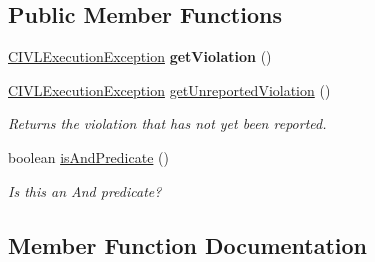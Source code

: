 \subsection*{Public Member Functions}
\begin{DoxyCompactItemize}
\item 
\hypertarget{interfaceedu_1_1udel_1_1cis_1_1vsl_1_1civl_1_1predicate_1_1IF_1_1CIVLStatePredicate_a56a142dd4cec66fef23a4272c1ce30d8}{}\hyperlink{classedu_1_1udel_1_1cis_1_1vsl_1_1civl_1_1log_1_1IF_1_1CIVLExecutionException}{C\+I\+V\+L\+Execution\+Exception} {\bfseries get\+Violation} ()\label{interfaceedu_1_1udel_1_1cis_1_1vsl_1_1civl_1_1predicate_1_1IF_1_1CIVLStatePredicate_a56a142dd4cec66fef23a4272c1ce30d8}

\item 
\hyperlink{classedu_1_1udel_1_1cis_1_1vsl_1_1civl_1_1log_1_1IF_1_1CIVLExecutionException}{C\+I\+V\+L\+Execution\+Exception} \hyperlink{interfaceedu_1_1udel_1_1cis_1_1vsl_1_1civl_1_1predicate_1_1IF_1_1CIVLStatePredicate_ad126976823c876047d5d12322f231fd2}{get\+Unreported\+Violation} ()
\begin{DoxyCompactList}\small\item\em Returns the violation that has not yet been reported. \end{DoxyCompactList}\item 
boolean \hyperlink{interfaceedu_1_1udel_1_1cis_1_1vsl_1_1civl_1_1predicate_1_1IF_1_1CIVLStatePredicate_ad2d1ebc37f839517ac8486ea1ba37701}{is\+And\+Predicate} ()
\begin{DoxyCompactList}\small\item\em Is this an And predicate? \end{DoxyCompactList}\end{DoxyCompactItemize}


\subsection{Member Function Documentation}
\hypertarget{interfaceedu_1_1udel_1_1cis_1_1vsl_1_1civl_1_1predicate_1_1IF_1_1CIVLStatePredicate_ad126976823c876047d5d12322f231fd2}{}
